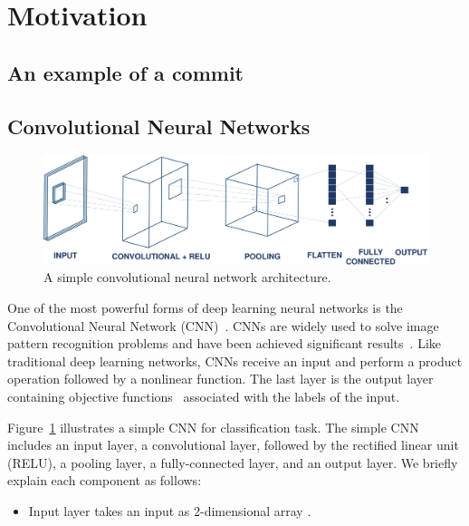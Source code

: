 
\section{Motivation}
\label{sec:motivation}

\subsection{An example of a commit }
\label{sec:examle}

\subsection{Convolutional Neural Networks}
\label{sec:background_cnn}

\begin{figure}[t!]
\center
\includegraphics[scale=0.3]{figs/cnn.pdf}
\caption{A simple convolutional neural network architecture.}
\label{fig:cnn}
\end{figure}

One of the most powerful forms of deep learning neural networks is the Convolutional Neural Network (CNN)~\cite{lecun2015deep}. CNNs are widely used to solve image pattern recognition problems and have been achieved significant results~\cite{karpathy2014large, lawrence1997face, krizhevsky2012imagenet}. Like traditional deep learning networks, CNNs receive an input and perform a product operation followed by a nonlinear function. The last layer is the output layer containing objective functions~\cite{zhao2017loss} associated with the labels of the input.

Figure~\ref{fig:cnn} illustrates a simple CNN for classification task. The simple CNN includes an input layer, a convolutional layer, followed by the rectified linear unit (RELU), a pooling layer, a fully-connected layer, and an output layer. We briefly explain each component as follows:
\begin{itemize}
    \item Input layer takes an input as 2-dimensional array . 
\end{itemize}




